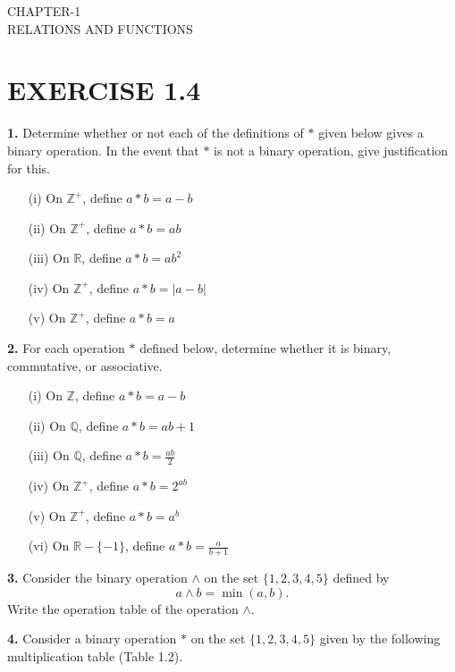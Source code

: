 \documentclass[a4paper,12pt]{article}
\begin{document}
\begin{center}
\textbf\large{CHAPTER-1 \\ RELATIONS AND FUNCTIONS}
\end{center}

\section*{EXERCISE 1.4}

\textbf{1.} Determine whether or not each of the definitions of $*$ given below gives a binary operation. In the event that $*$ is not a binary operation, give justification for this.

\begin{enumerate}
    \item[(i)] On $\mathbb{Z}^{+}$, define $a * b = a - b$
    \item[(ii)] On $\mathbb{Z}^{+}$, define $a * b = ab$
    \item[(iii)] On $\mathbb{R}$, define $a * b = ab^2$
    \item[(iv)] On $\mathbb{Z}^{+}$, define $a * b = |a - b|$
    \item[(v)] On $\mathbb{Z}^{+}$, define $a * b = a$
\end{enumerate}

\textbf{2.} For each operation $*$ defined below, determine whether it is binary, commutative, or associative.

\begin{enumerate}
    \item[(i)] On $\mathbb{Z}$, define $a * b = a - b$
    \item[(ii)] On $\mathbb{Q}$, define $a * b = ab + 1$
    \item[(iii)] On $\mathbb{Q}$, define $a * b = \frac{ab}{2}$
    \item[(iv)] On $\mathbb{Z}^{+}$, define $a * b = 2^{ab}$
    \item[(v)] On $\mathbb{Z}^{+}$, define $a * b = a^b$
    \item[(vi)] On $\mathbb{R} - \{-1\}$, define $a * b = \frac{a}{b+1}$
\end{enumerate}

\textbf{3.} Consider the binary operation $\wedge$ on the set $\{1,2,3,4,5\}$ defined by 
\[
a \wedge b = \min(a, b).
\]
Write the operation table of the operation $\wedge$.

\textbf{4.} Consider a binary operation $*$ on the set $\{1,2,3,4,5\}$ given by the following multiplication table (Table 1.2).
\end{document}

